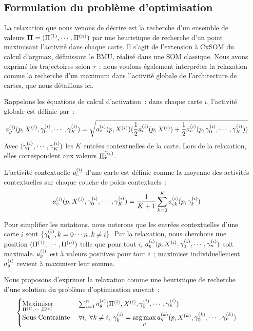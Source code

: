 \documentclass[../main]{subfiles}
\begin{document}
\subsection{Formulation du problème d'optimisation}\label{sec:formulation_argmax}

La relaxation que nous venons de décrire est la recherche d'un ensemble de valeurs $\mathbf{\Pi} = (\Pi^{({1})}, \cdots, \Pi^{({n})})$ par une heuristique de recherche d'un point maximisant l'activité dans chaque carte. Il s'agit de l'extension à CxSOM du calcul d'argmax, définissant le BMU, réalisé dans une SOM classique. 
Nous avons exprimé les trajectoires selon $\tau$~; nous voulons également interpréter la relaxation comme la recherche d'un maximum dans l'activité globale de l'architecture de cartes, que nous détaillons ici. 

Rappelons les équations de calcul d'activation~:
dans chaque carte $i$, l'activité globale est définie par~:
\begin{equation}\label{eq:ag}
	a_g^{({i})}(p, X^{({i})}, \gamma^{({i})}_0, \cdots, \gamma^{({i})}_K) = \sqrt{a_e^{({i})}(p,X^{({i})})(\frac{1}{2}a_e^{({i})}(p,X^{({i})}) + \frac{1}{2}a_c^{({i})}(p,\gamma^{({i})}_0, \cdots, \gamma^{({i})}_K))}
\end{equation}
Avec $(\gamma^{({i})}_0, \cdots, \gamma^{({i})}_K)$ les $K$ entrées contextuelles de la carte. Lors de la relaxation, elles correspondent aux valeurs $\Pi^{({i_k})}_\tau$.

L'activité contextuelle $a_c^{({i})}$ d'une carte est définie comme la moyenne des activités contextuelles sur chaque couche de poids contextuels~:
\begin{equation}
	a_c^{({i})}(p,  X^{({i})}, \gamma^{({i})}_0, \cdots, \gamma^{({i})}_K) = \frac{1}{K+1}\sum_{k=0}^{K}{a_{ck}^{({i})}(p, \gamma^{({i})}_k)}
\end{equation}

Pour simplifier les notations, nous noterons que les entrées contextuelles d'une carte $i$ sont $\{ \gamma^{({i})}_k, k = 0 \cdots n , k \neq i  \}$.
Par la relaxation, nous cherchons une position $(\Pi^{({1})}, \cdots, \Pi^{({n})})$ telle que pour tout $i$, $a_g^{({i})}(p,  X^{({i})}, \gamma^{({i})}_0, \cdots, \gamma^{({i})}_n)$ soit maximale. 
$a_g^{({i})}$ est à valeurs positives pour tout $i$~; maximiser individuellement $a_g^{({i})}$ revient à maximiser leur somme.

Nous proposons d'exprimer la relaxation comme une heuristique de recherche d'une solution du problème d'optimisation suivant~:
\begin{equation}\label{eq:opti}
	\begin{cases}
	\operatorname*{Maximiser}\limits_{\Pi^{({1})}, \cdots, \Pi^{({n})}}\;& \sum_{i = 1}^n a_g^{({i})}(\Pi^{({i})},X^{({i})},\gamma_0^{({i})}, \cdots, \gamma_n^{({i})}) \\
	\text{Sous Contrainte}\; &\forall i,\:\forall k \neq i, \; \gamma_k^{({i})} = \operatorname*{arg\,max}\limits_p a_g^{({k})}(p, X^{({k})}, \gamma_0^{({k})}, \cdots, \gamma_n^{({k})})
	\end{cases}
\end{equation}
\end{document}
